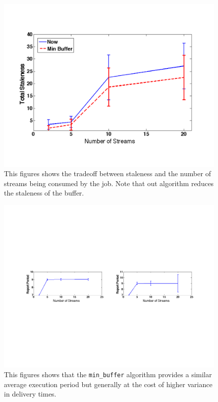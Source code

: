 \begin{figure}[t!] %
\centering
\includegraphics[width=0.9\columnwidth]{figs/staleness_vs_numstreams}
\caption{This figures shows the tradeoff between staleness and the number of streams being consumed by the job.  Note 
that out algorithm reduces the staleness of the buffer.}
\label{fig:stalevsstreams}
\end{figure}

\begin{figure}[t!] %
\centering
\includegraphics[width=1.0	\columnwidth]{figs/period_vs_streams}
\caption{This figures shows that the \texttt{min\_buffer} algorithm provides a similar average execution period but generally
at the cost of higher variance in delivery times.}
\label{fig:report_periods}
\end{figure}